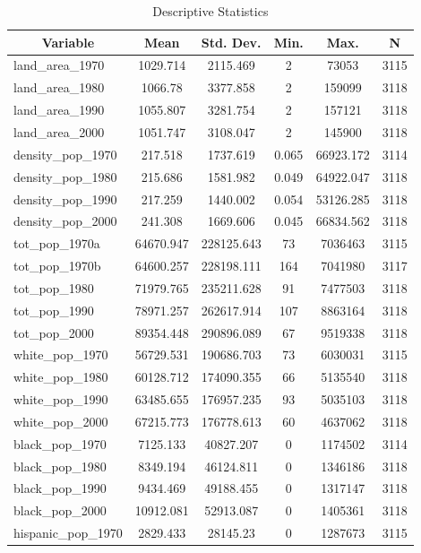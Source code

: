 
\begin{table}[htbp]\centering \caption{Descriptive Statistics \label{desc_stat_tab_1}}
\begin{tabular}{l c c c c c}\hline\hline
\multicolumn{1}{c}{\textbf{Variable}} & \textbf{Mean}
 & \textbf{Std. Dev.}& \textbf{Min.} &  \textbf{Max.} & \textbf{N}\\ \hline
land\_area\_1970 & 1029.714 & 2115.469 & 2 & 73053 & 3115\\
land\_area\_1980 & 1066.78 & 3377.858 & 2 & 159099 & 3118\\
land\_area\_1990 & 1055.807 & 3281.754 & 2 & 157121 & 3118\\
land\_area\_2000 & 1051.747 & 3108.047 & 2 & 145900 & 3118\\
density\_pop\_1970 & 217.518 & 1737.619 & 0.065 & 66923.172 & 3114\\
density\_pop\_1980 & 215.686 & 1581.982 & 0.049 & 64922.047 & 3118\\
density\_pop\_1990 & 217.259 & 1440.002 & 0.054 & 53126.285 & 3118\\
density\_pop\_2000 & 241.308 & 1669.606 & 0.045 & 66834.562 & 3118\\
tot\_pop\_1970a & 64670.947 & 228125.643 & 73 & 7036463 & 3115\\
tot\_pop\_1970b & 64600.257 & 228198.111 & 164 & 7041980 & 3117\\
tot\_pop\_1980 & 71979.765 & 235211.628 & 91 & 7477503 & 3118\\
tot\_pop\_1990 & 78971.257 & 262617.914 & 107 & 8863164 & 3118\\
tot\_pop\_2000 & 89354.448 & 290896.089 & 67 & 9519338 & 3118\\
white\_pop\_1970 & 56729.531 & 190686.703 & 73 & 6030031 & 3115\\
white\_pop\_1980 & 60128.712 & 174090.355 & 66 & 5135540 & 3118\\
white\_pop\_1990 & 63485.655 & 176957.235 & 93 & 5035103 & 3118\\
white\_pop\_2000 & 67215.773 & 176778.613 & 60 & 4637062 & 3118\\
black\_pop\_1970 & 7125.133 & 40827.207 & 0 & 1174502 & 3114\\
black\_pop\_1980 & 8349.194 & 46124.811 & 0 & 1346186 & 3118\\
black\_pop\_1990 & 9434.469 & 49188.455 & 0 & 1317147 & 3118\\
black\_pop\_2000 & 10912.081 & 52913.087 & 0 & 1405361 & 3118\\
hispanic\_pop\_1970 & 2829.433 & 28145.23 & 0 & 1287673 & 3115\\

\end{tabular}
\end{table}
